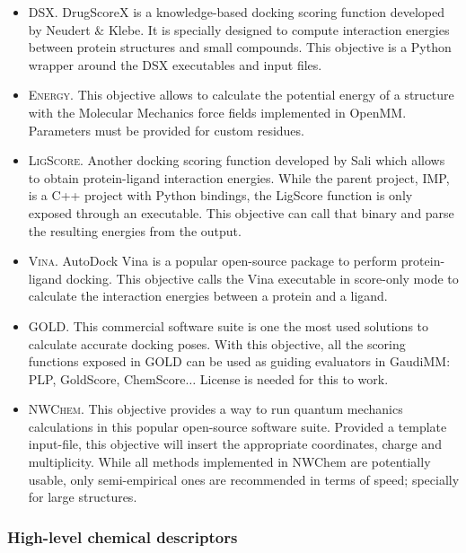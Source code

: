 \begin{itemize}
	\item \textsc{DSX}. DrugScoreX is a knowledge-based docking scoring function developed by Neudert $\&$  Klebe.\cite{neudert2011dsx} It is specially designed to compute interaction energies between protein structures and small compounds. This objective is a Python wrapper around the DSX executables and input files.

	\item \textsc{Energy}. This objective allows to calculate the potential energy of a structure with the Molecular Mechanics force fields implemented in OpenMM. Parameters must be provided for custom residues.

	\item \textsc{LigScore}. Another docking scoring function developed by Sali\cite{krammer2005ligscore} which allows to obtain protein-ligand interaction energies. While the parent project, IMP,\cite{russel2012putting} is a C++ project with Python bindings, the LigScore function is only exposed through an executable. This objective can call that binary and parse the resulting energies from the output.

	\item \textsc{Vina}. AutoDock Vina\cite{trott2010autodock} is a popular open-source package to perform protein-ligand docking. This objective calls the Vina executable in score-only mode to calculate the interaction energies between a protein and a ligand.

	\item \textsc{GOLD}. This commercial software suite is one the most used solutions to calculate accurate docking poses. With this objective, all the scoring functions exposed in GOLD\cite{gold} can be used as guiding evaluators in GaudiMM: PLP, GoldScore, ChemScore$ \ldots $  License is needed for this to work.

	\item \textsc{NWChem}. This objective provides a way to run quantum mechanics calculations in this popular open-source software suite.\cite{nwchem} Provided a template input-file, this objective will insert the appropriate coordinates, charge and multiplicity. While all methods implemented in NWChem are potentially usable, only semi-empirical ones are recommended in terms of speed; specially for large structures.


\end{itemize}\subsubsection{High-level chemical descriptors}
